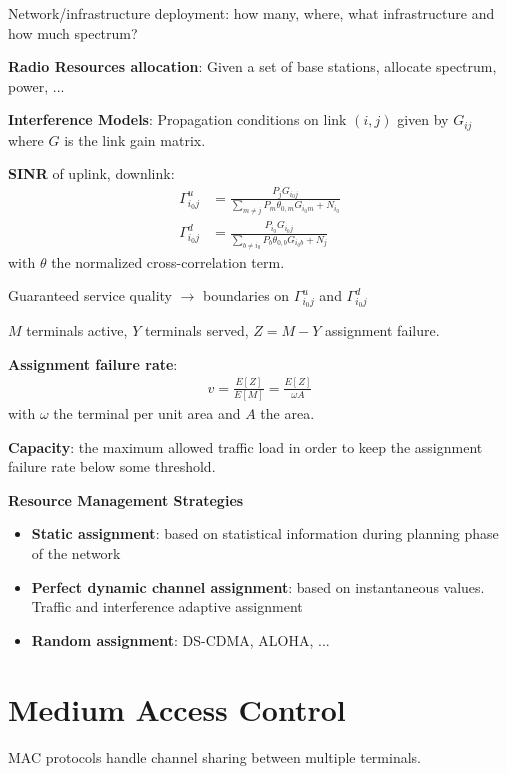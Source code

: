 Network/infrastructure deployment: how many, where, what infrastructure and how much spectrum?

\textbf{Radio Resources allocation}: Given a set of base stations, allocate spectrum, power, ...

\textbf{Interference Models}: Propagation conditions on link $(i,j)$ given by $G_{ij}$ where $G$ is the link gain matrix.

\textbf{SINR} of uplink, downlink:
\begin{align*}
	\Gamma^u_{i_0 j} &= \frac{P_j G_{i_0 j}}{\sum_{m \neq j} P_m \theta_{0, m} G_{i_0 m} + N_{i_0}} \\
	\Gamma^d_{i_0 j} &= \frac{P_{i_0} G_{i_0 j}}{\sum_{b \neq i_0} P_b \theta_{0, b} G_{i_0 b} + N_{j}}
\end{align*}
with $\theta$ the normalized cross-correlation term.

Guaranteed service quality $\rightarrow$ boundaries on $\Gamma^u_{i_0 j}$ and $\Gamma^d_{i_0 j}$

$M$ terminals active, $Y$ terminals served, $Z = M - Y$ assignment failure.

\textbf{Assignment failure rate}: 
\begin{align*}
	v = \frac{E[Z]}{E[M]} = \frac{E[Z]}{ \omega A }
\end{align*}
with $\omega$ the terminal per unit area and $A$ the area.


\textbf{Capacity}: the maximum allowed traffic load in order to keep the assignment failure rate below some threshold.

\textbf{Resource Management Strategies}
\begin{itemize}
	\item \textbf{Static assignment}: based on statistical information during planning phase of the network
	\item \textbf{Perfect dynamic channel assignment}: based on instantaneous values. Traffic and interference adaptive assignment
	\item \textbf{Random assignment}: DS-CDMA, ALOHA, ...
\end{itemize}


\section{Medium Access Control}

MAC protocols handle channel sharing between multiple terminals.

